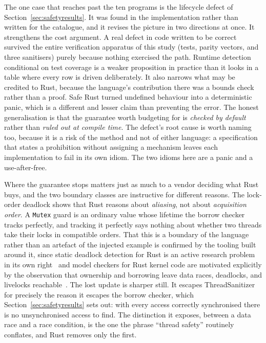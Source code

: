 \documentclass[english,twoside,openright,a4paper,censored,csm,software-track-2020]{HYthesisML}
\begin{document}
The one case that reaches past the ten programs is the lifecycle defect of
Section~\ref{sec:safetyresults}. It was found in the implementation rather than written for
the catalogue, and it revises the picture in two directions at once. It strengthens the cost
argument. A real defect in code written to be correct survived the entire verification
apparatus of this study (tests, parity vectors, and three sanitisers) purely because
nothing exercised the path. Runtime detection conditional on test coverage is a weaker
proposition in practice than it looks in a table where every row is driven deliberately. It also
narrows what may be credited to Rust, because the language's contribution there was a bounds
check rather than a proof. Safe Rust turned undefined behaviour into a deterministic panic, which
is a different and lesser claim than preventing the error. The honest generalisation is that
the guarantee worth budgeting for is \emph{checked by default} rather than \emph{ruled out at
compile time}. The defect's root cause is worth naming too, because it is a risk of the method
and not of either language: a specification that states a prohibition without assigning a
mechanism leaves each implementation to fail in its own idiom. The two idioms here are a
panic and a use-after-free.

Where the guarantee stops matters just as much to a vendor deciding what Rust buys, and the two
boundary classes are instructive for different reasons. The lock-order deadlock shows that Rust
reasons about \emph{aliasing}, not about \emph{acquisition order}. A \texttt{Mutex} guard is an
ordinary value whose lifetime the borrow checker tracks perfectly, and tracking it perfectly
says nothing about whether two threads take their locks in compatible orders. That this is a
boundary of the language rather than an artefact of the injected example is confirmed by the
tooling built around it, since static deadlock detection for Rust is an active research problem
in its own right~\cite{zhang2026deadlock} and model checkers for Rust kernel code are motivated
explicitly by the observation that ownership and borrowing leave data races, deadlocks, and
livelocks reachable~\cite{tang2025converos}. The lost update is sharper still. It escapes
ThreadSanitizer for precisely the reason it escapes the borrow checker, which
Section~\ref{sec:safetyresults} sets out: with every access correctly synchronised there is no
unsynchronised access to find. The distinction it exposes, between a data race and a race
condition, is the one the phrase ``thread safety'' routinely conflates, and Rust removes only
the first.
\end{document}
